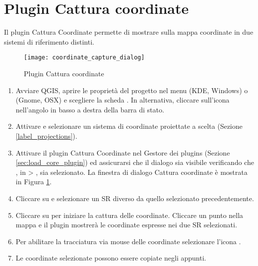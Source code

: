 
\section{Plugin Cattura coordinate}\label{coordcapt}


Il plugin Cattura Coordinate permette di mostrare sulla mappa coordinate in due sistemi di riferimento distinti.

\begin{figure}[ht]
   \centering
   \texttt{[image: coordinate\_capture\_dialog]}
   \caption{Plugin Cattura coordinate \nixcaption}\label{fig:coordinate_capture_dialog}
\end{figure}


\begin{enumerate}
  \item Avviare QGIS, aprire le proprietà del progetto  nel menu
   (KDE, Windows) o  (Gnome, OSX) e scegliere la 
  scheda . In alternativa, cliccare sull'icona 
   nell'angolo in basso a destra della barra di stato.
  \item Attivare  e selezionare un sistema di coordinate
  proiettate a scelta (Sezione \ref{label_projections}).
  \item Attivare il plugin Cattura Coordinate nel Gestore dei plugins (Sezione \ref{sec:load_core_plugin}) 
  ed assicurarsi che il dialogo sia visibile verificando che , in 
   > , sia selezionato. 
  La finestra di dialogo Cattura coordinate è mostrata in Figura \ref{fig:coordinate_capture_dialog}.
  \item Cliccare su  e selezionare un SR diverso da quello selezionato precedentemente.
  \item Cliccare su  per iniziare la cattura delle coordinate. Cliccare un punto nella mappa 
  e il plugin mostrerà le coordinate espresse nei due SR selezionati.
  \item Per abilitare la tracciatura via mouse delle coordinate selezionare l'icona .
  \item Le coordinate selezionate possono essere copiate negli appunti.
\end{enumerate}

\FloatBarrier